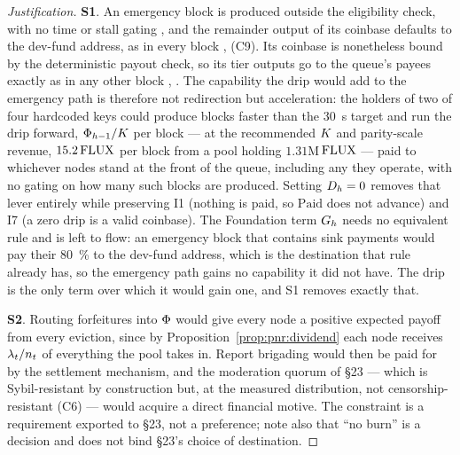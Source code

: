 \begin{proof}[Justification]
\textbf{S1}. An emergency block is produced outside the \PoN eligibility check, with no time or
stall gating , and the
remainder output of its coinbase defaults to the dev-fund address, as in every block
,
 (C9). Its
coinbase is nonetheless bound by the deterministic payout check, so its tier outputs go to the
queue's payees exactly as in any other block
,
. The capability the drip would
add to the emergency path is therefore not redirection but acceleration: the holders of two of four
hardcoded keys could produce blocks faster than the \SI{30}{\second} target and run the drip
forward, $\Phi_{h-1}/K$ per block --- at the recommended $K$ and parity-scale revenue,
$15.2\,\mathrm{FLUX}$ per block from a pool holding $1.31$M$\,\mathrm{FLUX}$ --- paid to whichever nodes stand at the
front of the queue, including any they operate, with no gating on how many such blocks are
produced. Setting $D_{h} = 0$ removes that lever entirely while preserving I1 (nothing is paid, so
$\mathrm{Paid}$ does not advance) and I7 (a zero drip is a valid coinbase). The Foundation term
$G_{h}$ needs no equivalent rule and is left to flow: an emergency block that contains sink
payments would pay their \SI{80}{\percent} to the dev-fund address, which is the destination that
rule already has, so the emergency path gains no capability it did not have. The drip is the only
term over which it would gain one, and S1 removes exactly that.

\textbf{S2}. Routing forfeitures into $\Phi$ would give every node a positive expected payoff from
every eviction, since by Proposition~\ref{prop:pnr:dividend} each node receives
$\lambda_{t}/n_{t}$ of everything the pool takes in. Report brigading would then be paid for
by the settlement mechanism, and the moderation quorum of \S23 --- which is Sybil-resistant by
construction but, at the measured distribution, not censorship-resistant (C6) --- would acquire a
direct financial motive. The constraint is a requirement exported to \S23, not a preference; note
also that ``no burn'' is a \PNR decision and does not bind \S23's choice of destination.
\end{proof}

